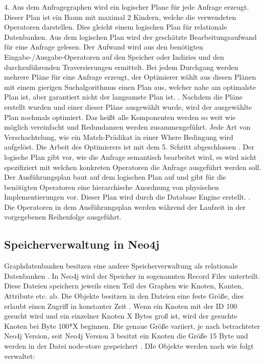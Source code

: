 4. Aus dem Anfragegraphen wird ein logischer Plane für jede Anfrage erzeugt. Dieser Plan ist ein Baum mit maximal 2 Kindern, welche die verwendeten Operatoren darstellen. Dies gleicht einem logischen Plan für relationale Datenbanken. Aus dem logischen Plan wird der geschätzte Bearbeitungsaufwand für eine Anfrage gelesen. Der Aufwand wird aus den benötigten Eingabe-/Ausgabe-Operatoren auf den Speicher oder Indizies und den durchzuführenden Traversierungen ermittelt. Bei jedem Durchgang werden mehrere Pläne für eine Anfrage erzeugt, der Optimierer wählt aus diesen Plänen mit einem gierigen Suchalgorithmus einen Plan aus, welcher nahe am optimalste Plan ist, aber garantiert nicht der langsamste Plan ist. \newline {}. Nachdem die Pläne erstellt wurden und einer dieser Pläne ausgewählt wurde, wird der ausgewählte Plan nochmals optimiert. Das heißt alle Komponenten werden so weit wie möglich vereinfacht und Redundanzen werden zusammengeführt. Jede Art von Verschachtelung, wie ein Match-Prädikat in einer Where Bedingung wird aufgelöst. Die Arbeit des Optimierers ist mit dem 5. Schritt abgeschlossen \newline {}. Der logische Plan gibt vor, wie die Anfrage semantisch bearbeitet wird, es wird nicht spezifiziert mit welchen konkreten Operatoren die Anfrage ausgeführt werden soll. Der Ausführungsplan baut auf dem logischen Plan auf und gibt für die benötigten Operatoren eine hierarchische Anordnung von physischen  Implementierungen vor. Dieser Plan wird durch die Database Engine erstellt.  \newline {}. Die Operatoren in dem Ausführungsplan werden während der Laufzeit in der vorgegebenen Reihenfolge ausgeführt. 


\subsection{Speicherverwaltung in Neo4j}
Graphdatenbanken besitzen eine andere Speicherverwaltung als relationale Datenbanken \parencite{angles2012comparison}. In Neo4j wird der Speicher in sogenannten Record Files unterteilt. Diese Dateien speichern jeweils einen Teil des Graphen wie Knoten, Kanten, Attribute etc. ab. Die Objekte besitzen in den Dateien eine feste Größe, dies erlaubt einen Zugriff in konstanter Zeit \parencite{robinson2013graph}. Wenn ein Knoten mit der ID 100 gesucht wird und ein einzelner Knoten X Bytes groß ist, wird der gesuchte Knoten bei Byte 100*X beginnen. Die genaue Größe  variiert, je nach betrachteter Neo4j Version, seit Neo4j Version 3 besitzt ein Knoten die Größe 15 Byte und werden in der Datei node-store gespeichert \parencite{Storage}. DIe Objekte werden nach \parencite{robinson2013graph} wie folgt verwaltet:
